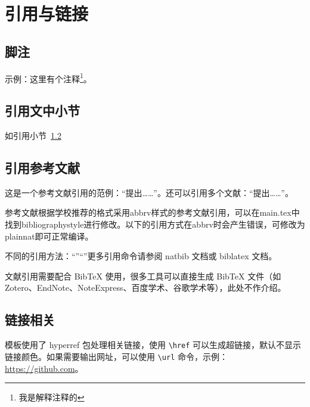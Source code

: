 \chapter{引用与链接}\label{cha:ref}

\section{脚注}
示例：这里有个注释\footnote{我是解释注释的}。

\section{引用文中小节}\label{sec:ref}
如引用小节~\ref{sec:ref}

\section{引用参考文献}
这是一个参考文献引用的范例：“\cite{江泽民1989能源发展趋势及主要节能措施}提出……”。还可以引用多个文献：“\cite{kuhn2004man,江泽民2008新时期我国信息技术产业的发展,江泽民1989能源发展趋势及主要节能措施}提出……”。

参考文献根据学校推荐的格式采用abbrv样式的参考文献引用，可以在main.tex中找到bibliographystyle进行修改。以下的引用方式在abbrv时会产生错误，可修改为plainnat即可正常编译。

不同的引用方法：“\citet{江泽民1989能源发展趋势及主要节能措施}”“\citep{江泽民2008新时期我国信息技术产业的发展}”更多引用命令请参阅 natbib 文档或 biblatex 文档。\nocite{*}

文献引用需要配合 BibTeX 使用，很多工具可以直接生成 BibTeX 文件（如 Zotero、EndNote、NoteExpress、百度学术、谷歌学术等），此处不作介绍。

\section{链接相关}
模板使用了 hyperref 包处理相关链接，使用 \verb|\href| 可以生成超链接，默认不显示链接颜色。如果需要输出网址，可以使用 \verb|\url| 命令，示例：\url{https://github.com}。